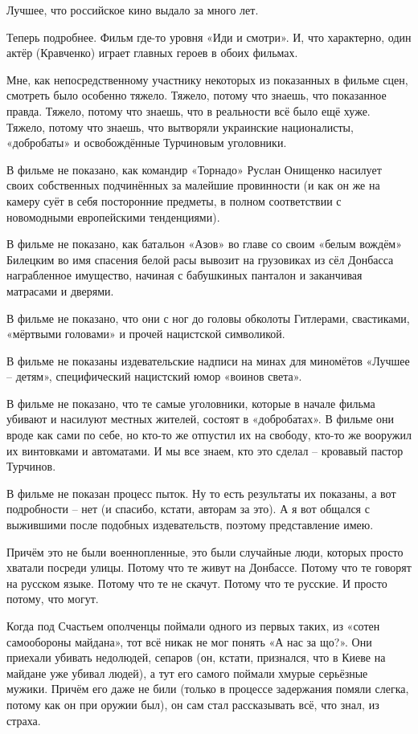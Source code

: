 \begin{itemize}
\begin{itemize}
Лучшее, что российское кино выдало за много лет.

Теперь подробнее. Фильм где-то уровня «Иди и смотри». И, что характерно, один
актёр (Кравченко) играет главных героев в обоих фильмах.

Мне, как непосредственному участнику некоторых из показанных в фильме сцен,
смотреть было особенно тяжело. Тяжело, потому что знаешь, что показанное
правда. Тяжело, потому что знаешь, что в реальности всё было ещё хуже. Тяжело,
потому что знаешь, что вытворяли украинские националисты, «добробаты» и
освобождённые Турчиновым уголовники.

В фильме не показано, как командир «Торнадо» Руслан Онищенко насилует своих
собственных подчинённых за малейшие провинности (и как он же на камеру суёт в
себя посторонние предметы, в полном соответствии с новомодными европейскими
тенденциями).

В фильме не показано, как батальон «Азов» во главе со своим «белым вождём»
Билецким во имя спасения белой расы вывозит на грузовиках из сёл Донбасса
награбленное имущество, начиная с бабушкиных панталон и заканчивая матрасами и
дверями.

В фильме не показано, что они с ног до головы обколоты Гитлерами, свастиками,
«мёртвыми головами» и прочей нацистской символикой.

В фильме не показаны издевательские надписи на минах для миномётов «Лучшее –
детям», специфический нацистский юмор «воинов света».

В фильме не показано, что те самые уголовники, которые в начале фильма убивают
и насилуют местных жителей, состоят в «добробатах». В фильме они вроде как сами
по себе, но кто-то же отпустил их на свободу, кто-то же вооружил их винтовками
и автоматами. И мы все знаем, кто это сделал – кровавый пастор Турчинов.

В фильме не показан процесс пыток. Ну то есть результаты их показаны, а вот
подробности – нет (и спасибо, кстати, авторам за это). А я вот общался с
выжившими после подобных издевательств, поэтому представление имею.

Причём это не были военнопленные, это были случайные люди, которых просто
хватали посреди улицы. Потому что те живут на Донбассе. Потому что те говорят
на русском языке. Потому что те не скачут. Потому что те русские. И просто
потому, что могут.

Когда под Счастьем ополченцы поймали одного из первых таких, из «сотен
самообороны майдана», тот всё никак не мог понять «А нас за що?». Они приехали
убивать недолюдей, сепаров (он, кстати, признался, что в Киеве на майдане уже
убивал людей), а тут его самого поймали хмурые серьёзные мужики. Причём его
даже не били (только в процессе задержания помяли слегка, потому как он при
оружии был), он сам стал рассказывать всё, что знал, из страха.


\end{itemize}
\end{itemize}
